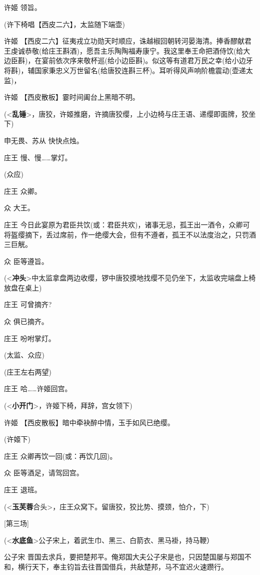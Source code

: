 许姬 领旨。

(许下椅唱【西皮二六】，太监随下端壶)

许姬
【西皮二六】征夷戎立功勋天时顺应，诛越椒回朝转河晏海清。捧香醪献君王虔诚恭敬(给庄王斟酒)，愿吾主乐陶陶福寿康宁。我这里奉王命把酒侍饮(给大边臣斟)，在宴前依次序来敬杯巡(给小边臣斟)。似这等有道君万民之幸(给小边牙将斟)，辅国家秉忠义万世留名(给唐狡连斟三杯)。耳听得风声响阶檐震动(壶递太监)，

许姬 【西皮散板】霎时间阖台上黑暗不明。

(\textless{}\textbf{乱锤}\textgreater{}，唐狡，许姬推磨，许摘唐狡缨，上小边椅与庄王语、递缨即面牌，狡坐下)

申无畏、苏从 快快点烛。

庄王 慢、慢\ldots{}\ldots{}掌灯。

(众应)

庄王 众卿。

众 大王。

庄王
今日此宴原为君臣共饮(或：君臣共欢)，诸事无忌，孤王出一酒令，众卿可将盔缨摘下，丢过席前，作一绝缨大会，但有不遵者，孤王不以法度治之，只罚酒三巨觥。

众 臣等遵旨。

(\textless{}\textbf{冲头}\textgreater{}中太监拿盘两边收缨，锣中唐狡摸地找缨不见仍坐下，太监收完端盘上椅放盘在桌上)

庄王 可曾摘齐?

众 俱已摘齐。

庄王 吩咐掌灯。

(太监、众应)

(庄王左右两望)

庄王 哈\ldots{}\ldots{}许姬回宫。

(\textless{}\textbf{小开门}\textgreater{}，许姬下椅，拜辞，宫女领下)

许姬 【西皮散板】暗中牵袂醉中情，玉手如风已绝缨。

(许姬下)

庄王 众卿再饮一回(或：再饮几回)。

众 臣等酒足，请驾回宫。

庄王 退班。

(\textless{}\textbf{玉芙蓉}合头\textgreater{}，庄王众窝下。留唐狡，狡比势、摸颈，怕介，下)

{[}第三场{]}

(\textless{}\textbf{水底鱼}\textgreater{}公子宋上，着武生巾、黑三、白箭衣、黑马褂，持马鞭）

公子宋
晋国去求兵，要把楚邦平。俺郑国大夫公子宋是也，只因楚国屡与郑国不和，横行天下，奉主钧旨去往晋国借兵，共敌楚邦，马不宜迟火速躜行。

